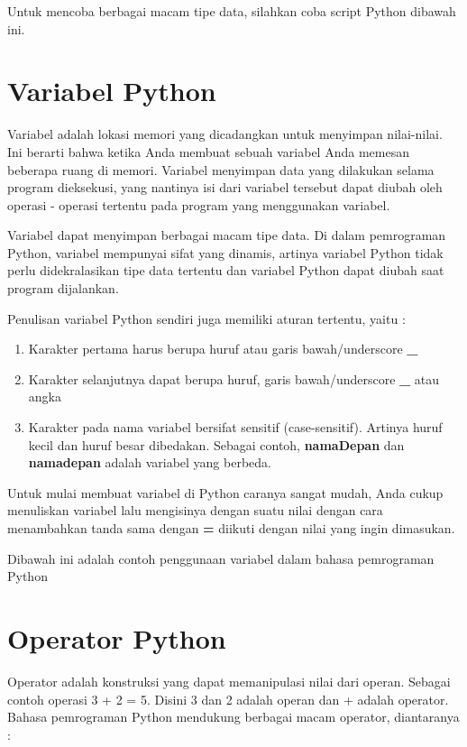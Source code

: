 Untuk mencoba berbagai macam tipe data, silahkan coba script Python dibawah ini.


\section{Variabel Python}
Variabel adalah lokasi memori yang dicadangkan untuk menyimpan nilai-nilai. Ini berarti bahwa ketika Anda membuat sebuah variabel Anda memesan beberapa ruang di memori. Variabel menyimpan data yang dilakukan selama program dieksekusi, yang nantinya isi dari variabel tersebut dapat diubah oleh operasi - operasi tertentu pada program yang menggunakan variabel.

Variabel dapat menyimpan berbagai macam tipe data. Di dalam pemrograman Python, variabel mempunyai sifat yang dinamis, artinya variabel Python tidak perlu didekralasikan tipe data tertentu dan variabel Python dapat diubah saat program dijalankan.

Penulisan variabel Python sendiri juga memiliki aturan tertentu, yaitu :

\begin{enumerate}
\item Karakter pertama harus berupa huruf atau garis bawah/underscore \textbf{\_}
\item Karakter selanjutnya dapat berupa huruf, garis bawah/underscore \textbf{\_} atau angka
\item Karakter pada nama variabel bersifat sensitif (case-sensitif). Artinya huruf kecil dan huruf besar dibedakan. Sebagai contoh, \textbf{namaDepan} dan \textbf{namadepan} adalah variabel yang berbeda.
\end{enumerate}

Untuk mulai membuat variabel di Python caranya sangat mudah, Anda cukup menuliskan variabel lalu mengisinya dengan suatu nilai dengan cara menambahkan tanda sama dengan \textbf{=} diikuti dengan nilai yang ingin dimasukan.

Dibawah ini adalah contoh penggunaan variabel dalam bahasa pemrograman Python


\section{Operator Python}
Operator adalah konstruksi yang dapat memanipulasi nilai dari operan. Sebagai contoh operasi 3 + 2 = 5. Disini 3 dan 2 adalah operan dan + adalah operator. Bahasa pemrograman Python mendukung berbagai macam operator, diantaranya :


